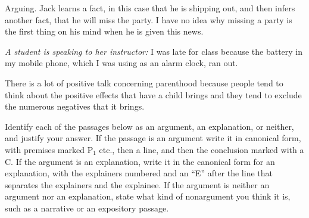 \begin{exercises}
{Arguing. Jack learns a fact, in this case that he is shipping out, and then infers another fact, that he will miss the party. I have no idea why missing a party is the first thing on his mind when he is given this news. }%



\item \textit{A student is speaking to her instructor: }I was late for class because the battery in my mobile phone, which I was using as an alarm clock, ran out.
\item There is a lot of positive talk concerning parenthood because people tend to think about the positive effects that have a child brings and they tend to exclude the numerous negatives that it brings.

\end{exercises}



\noindent\problempart Identify each of the passages below as an argument, an explanation, or neither, and justify your answer. If the passage is an argument write it in canonical form, with premises marked P$_1$ etc., then a line, and then the conclusion marked with a C. If the argument is an explanation, write it in the canonical form for an explanation, with the explainers numbered and an ``E'' after the line that separates the explainers and the explainee. If the argument is neither an argument nor an explanation, state what kind of nonargument you think it is, such as a narrative or an expository passage.

